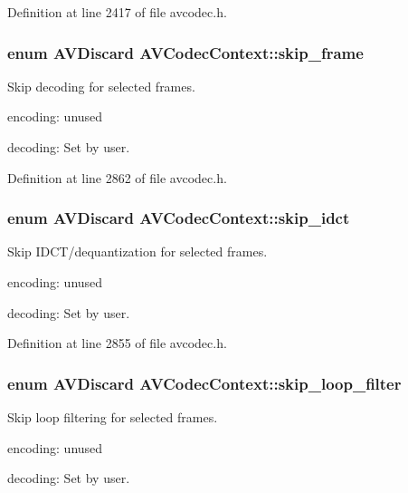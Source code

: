 Definition at line 2417 of file avcodec.\+h.

\subsubsection[{\texorpdfstring{skip\+\_\+frame}{skip_frame}}]{\setlength{\rightskip}{0pt plus 5cm}enum {\bf A\+V\+Discard} A\+V\+Codec\+Context\+::skip\+\_\+frame}\hypertarget{struct_a_v_codec_context_af869b808363998c80adf7df6a944a5a6}{}\label{struct_a_v_codec_context_af869b808363998c80adf7df6a944a5a6}
Skip decoding for selected frames.
\begin{DoxyItemize}
\item encoding\+: unused
\item decoding\+: Set by user. 
\end{DoxyItemize}

Definition at line 2862 of file avcodec.\+h.

\subsubsection[{\texorpdfstring{skip\+\_\+idct}{skip_idct}}]{\setlength{\rightskip}{0pt plus 5cm}enum {\bf A\+V\+Discard} A\+V\+Codec\+Context\+::skip\+\_\+idct}\hypertarget{struct_a_v_codec_context_ac3d90275bfb1153a5b00ebc2dd32a689}{}\label{struct_a_v_codec_context_ac3d90275bfb1153a5b00ebc2dd32a689}
Skip I\+D\+C\+T/dequantization for selected frames.
\begin{DoxyItemize}
\item encoding\+: unused
\item decoding\+: Set by user. 
\end{DoxyItemize}

Definition at line 2855 of file avcodec.\+h.

\subsubsection[{\texorpdfstring{skip\+\_\+loop\+\_\+filter}{skip_loop_filter}}]{\setlength{\rightskip}{0pt plus 5cm}enum {\bf A\+V\+Discard} A\+V\+Codec\+Context\+::skip\+\_\+loop\+\_\+filter}\hypertarget{struct_a_v_codec_context_a6be328131743a97103b89e028e62e771}{}\label{struct_a_v_codec_context_a6be328131743a97103b89e028e62e771}
Skip loop filtering for selected frames.
\begin{DoxyItemize}
\item encoding\+: unused
\item decoding\+: Set by user. 
\end{DoxyItemize}

